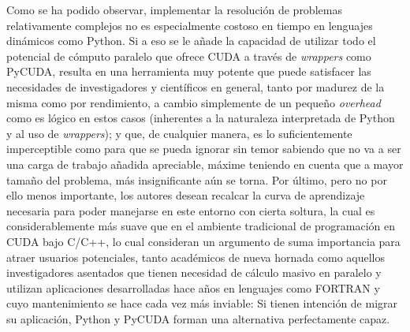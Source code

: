 \documentclass[twocolumn,twoside]{Jornadas}
\begin{document}
Como se ha podido observar, implementar la resolución de problemas relativamente complejos no es especialmente costoso en tiempo en lenguajes dinámicos como Python. Si a eso se le añade la capacidad de utilizar todo el potencial de cómputo paralelo que ofrece CUDA a través de \emph{wrappers} como PyCUDA, resulta en una herramienta muy potente que puede satisfacer las necesidades de investigadores y científicos en general, tanto por madurez de la misma como por rendimiento, a cambio simplemente de un pequeño \emph{overhead} como es lógico en estos casos (inherentes a la naturaleza interpretada de Python y al uso de \emph{wrappers}); y que, de cualquier manera, es lo suficientemente imperceptible como para que se pueda ignorar sin temor sabiendo que no va a ser una carga de trabajo añadida apreciable, máxime teniendo en cuenta que a mayor tamaño del problema, más insignificante aún se torna. Por último, pero no por ello menos importante, los autores desean recalcar la curva de aprendizaje necesaria para poder manejarse en este entorno con cierta soltura, la cual es considerablemente más suave que en el ambiente tradicional de programación en CUDA bajo C/C++, lo cual consideran un argumento de suma importancia para atraer usuarios potenciales, tanto académicos de nueva hornada como aquellos investigadores asentados que tienen necesidad de cálculo masivo en paralelo y utilizan aplicaciones desarrolladas hace años en lenguajes como FORTRAN y cuyo mantenimiento se hace cada vez más inviable: Si tienen intención de migrar su aplicación, Python y PyCUDA forman una alternativa perfectamente capaz.



\end{document}
